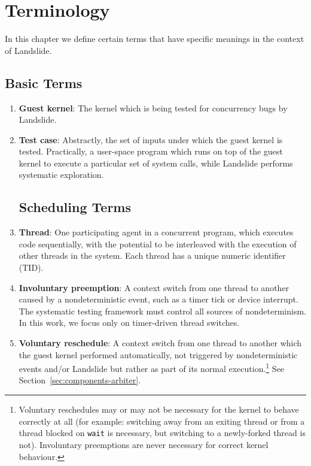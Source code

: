 \chapter{Terminology}

In this chapter we define certain terms that have specific meanings in the context of Landslide.

\section{Basic Terms}

\begin{enumerate}
	\item {\bf Guest kernel}:
		The kernel which is being tested for concurrency bugs by Landslide.
	\item {\bf Test case}:
		Abstractly, the set of inputs under which the guest kernel is tested. Practically, a user-space program which runs on top of the guest kernel to execute a particular set of system calls, while Landslide performs systematic exploration.

\section{Scheduling Terms}


	\item {\bf Thread}:
		One participating agent in a concurrent program, which executes code sequentially, with the potential to be interleaved with the execution of other threads in the system.
		Each thread has a unique numeric identifier (TID).
	\item {\bf Involuntary preemption}:
		A context switch from one thread to another caused by a nondeterministic event, such as a timer tick or device interrupt. The systematic testing framework must control all sources of nondeterminism. In this work, we focus only on timer-driven thread switches.
	\item {\bf Voluntary reschedule}:
		A context switch from one thread to another which the guest kernel performed automatically, not triggered by nondeterministic events and/or Landslide but rather as part of its normal execution.\footnote{Voluntary reschedules may or may not be necessary for the kernel to behave correctly at all (for example: switching away from an exiting thread or from a thread blocked on \texttt{wait} is necessary, but switching to a newly-forked thread is not). Involuntary preemptions are never necessary for correct kernel behaviour.}
		See Section~\ref{sec:components-arbiter}.


\end{enumerate}
